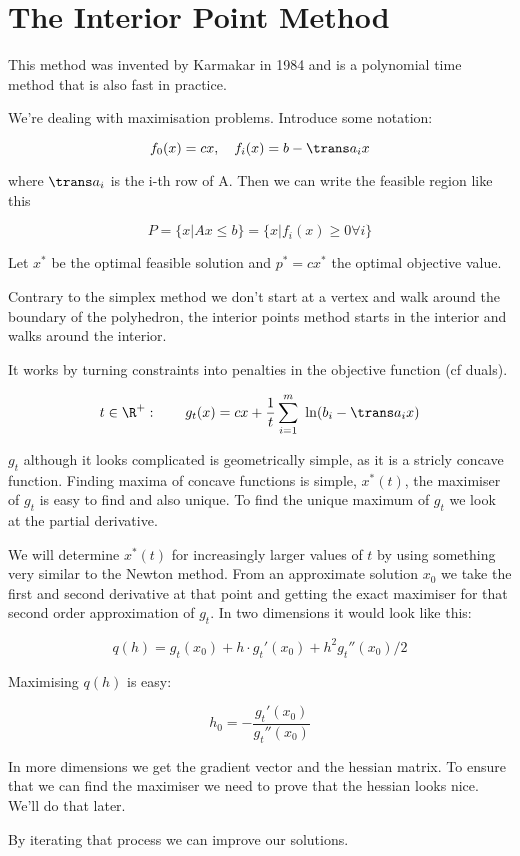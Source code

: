 \section{The Interior Point Method}

This method was invented by Karmakar in 1984 and is a polynomial time method that is also fast in practice.

We're dealing with maximisation problems. Introduce some notation:

\[f_0(x) = cx,\quad f_i(x)=b-\trans a_i x\]

where $\trans a_i$ is the i-th row of A. Then we can write the feasible region like this

\[P=\{x|Ax\leq b\}=\{x|f_i(x)\geq 0 \forall i\}\]

Let $x^*$ be the optimal feasible solution and $p^*=cx^*$ the optimal objective value. 

Contrary to the simplex method we don't start at a vertex and walk around the boundary of the polyhedron, the interior points method starts in the interior and walks around the interior.

It works by turning constraints into penalties in the objective function (cf duals). 

\[t\in \R^+:\qquad g_t(x)=cx+\frac 1t \sum_{i=1}^m \ln (b_i-\trans a_i x)\]

$g_t$ although it looks complicated is geometrically simple, as it is a stricly concave function. Finding maxima of concave functions is simple, $x^*(t)$, the maximiser of $g_t$ is easy to find and also unique. To find the unique maximum of $g_t$ we look at the partial derivative.

We will determine $x^*(t)$ for increasingly larger values of $t$ by using something very similar to the Newton method. From an approximate solution $x_0$ we take the first and second derivative at that point and getting the exact maximiser for that second order approximation of $g_t$. In two dimensions it would look like this:

\[q(h) = g_t(x_0) + h \cdot g_t'(x_0) + h^2 g_t''(x_0)/2\]

Maximising $q(h)$ is easy:

\[h_0 = - \frac{g_t'(x_0)}{g_t''(x_0)} \]

In more dimensions we get the gradient vector and the hessian matrix. To ensure that we can find the maximiser we need to prove that the hessian looks nice. We'll do that later.

By iterating that process we can improve our solutions.

